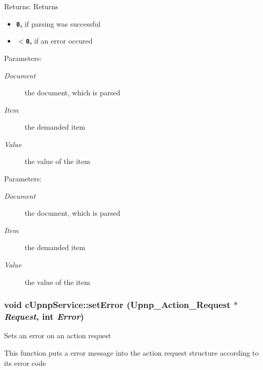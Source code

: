 \begin{Desc}
\item[Returns:]Returns\begin{itemize}
\item {\bf {\tt 0},} if parsing was successful\item {\bf {\tt $<$0},} if an error occured\end{itemize}
\end{Desc}
\begin{Desc}
\item[Parameters:]
\begin{description}
\item[{\em Document}]the document, which is parsed \item[{\em Item}]the demanded item \item[{\em Value}]the value of the item \end{description}
\end{Desc}
\begin{Desc}
\item[Parameters:]
\begin{description}
\item[{\em Document}]the document, which is parsed \item[{\em Item}]the demanded item \item[{\em Value}]the value of the item \end{description}
\end{Desc}
\hypertarget{classcUpnpService_f0976057350505eca781aafcaf6b1d14}{
\subsubsection[{setError}]{\setlength{\rightskip}{0pt plus 5cm}void cUpnpService::setError (Upnp\_\-Action\_\-Request $\ast$ {\em Request}, \/  int {\em Error})}}
\label{classcUpnpService_f0976057350505eca781aafcaf6b1d14}


Sets an error on an action request

This function puts a error message into the action request structure according to its error code

